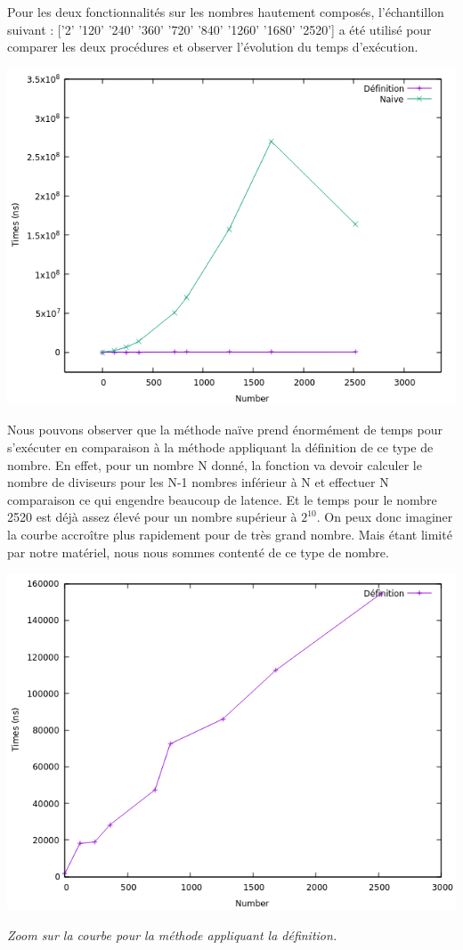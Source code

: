 	Pour les deux fonctionnalités sur les nombres hautement composés, l'échantillon suivant : ['2' '120' '240' '360' '720' '840' '1260' '1680' '2520'] a été utilisé pour comparer les deux procédures et observer l'évolution du temps d'exécution.\\
	\begin{center}\includegraphics[scale=0.5]{HC.png}\end{center}
	
Nous pouvons observer que la méthode naïve prend énormément de temps pour s'exécuter en comparaison à la méthode appliquant la définition de ce type de nombre. En effet, pour un nombre N donné, la fonction va devoir calculer le nombre de diviseurs pour les N-1 nombres inférieur à N et effectuer N comparaison ce qui engendre beaucoup de latence. Et le temps pour le nombre 2520 est déjà assez élevé  pour un nombre supérieur à $2^{10}$. On peux donc imaginer la courbe accroître plus rapidement pour de très grand nombre. Mais étant limité par notre matériel, nous nous sommes contenté de ce type de nombre.
	\begin{center}\includegraphics[scale=0.5]{HCdef.png}\end{center}
	 \textit{Zoom sur la courbe pour la méthode appliquant la définition.}
	
